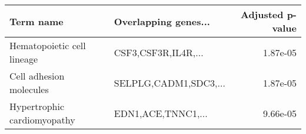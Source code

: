 \begin{tabular}{llr}
\toprule
                  Term name &  Overlapping genes... &  Adjusted p-value \\
\midrule
 Hematopoietic cell lineage &   CSF3,CSF3R,IL4R,... &          1.87e-05 \\
    Cell adhesion molecules & SELPLG,CADM1,SDC3,... &          1.87e-05 \\
Hypertrophic cardiomyopathy &    EDN1,ACE,TNNC1,... &          9.66e-05 \\
\bottomrule
\end{tabular}
